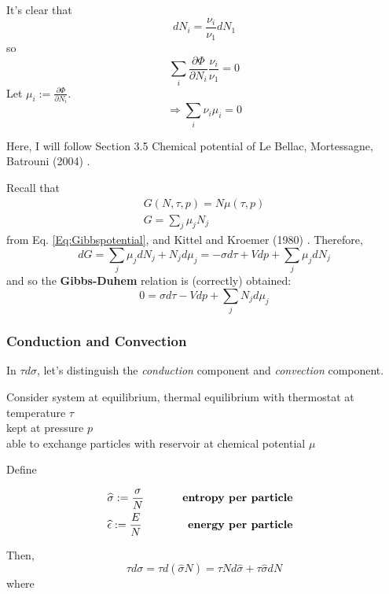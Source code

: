 \documentclass[10pt]{amsart}
\begin{document}
\begin{multicols*}{2}
It's clear that 
\[
dN_i = \frac{ \nu_i}{ \nu_1} dN_1
\]
so 
\[
\sum_i \frac{ \partial \Phi}{ \partial N_i} \frac{ \nu_i}{ \nu_1} = 0 
\]
Let $\mu_i := \frac{ \partial \Phi}{ \partial N_i}$.  
\begin{equation}
\Longrightarrow \sum_i \nu_i \mu_i = 0 
\end{equation}

Here, I will follow Section 3.5 Chemical potential of Le Bellac, Mortessagne, Batrouni (2004) \cite{MLeBellacFMortessagneGBatrouni2004}.  

Recall that 
\[
\begin{gathered}
  G(N,\tau,p) = N\mu(\tau,p) \\
  G = \sum_j \mu_j N_j 
\end{gathered}
\]
from Eq. \ref{Eq:Gibbspotential}, and Kittel and Kroemer (1980) \cite{CKittelHKroemer1980}.  Therefore,
\[
dG = \sum_j \mu_j dN_j + N_j d\mu_j = -\sigma d\tau + Vdp + \sum_j \mu_j dN_j
\]
and so the \textbf{Gibbs-Duhem} relation is (correctly) obtained:
\begin{equation}\label{Eq:Gibbs-Duhem}
  0 = \sigma d\tau - V dp + \sum_j N_j d\mu_j
\end{equation}

\subsubsection{Conduction and Convection}\label{SubsubSec:ConductionConvection}

In $\tau d\sigma$, let's distinguish the \emph{conduction} component and \emph{convection} component.

Consider system at equilibrium, thermal equilibrium with thermostat at temperature $\tau$ \\
\qquad kept at pressure $p$ \\
\qquad able to exchange particles with reservoir at chemical potential $\mu$

Define

\[
\begin{aligned}
  & \widehat{\sigma} := \frac{ \sigma}{N } \qquad \, & \text{ \textbf{entropy per particle } } \\
  & \widehat{\epsilon} := \frac{ E}{N } \qquad \, & \text{ \textbf{energy per particle } } 
\end{aligned}
\]

Then, 
\[
\boxed{ 
\tau d\sigma = \tau d(\widehat{\sigma}N) = \tau N d\widehat{\sigma} + \tau \widehat{\sigma} dN
}
\]
where \\


\end{multicols*}
\end{document}
